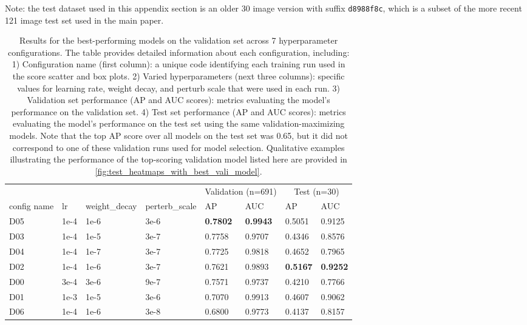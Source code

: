 Note:
the test dataset used in this appendix section is an older 30 image version with suffix {\tt d8988f8c},
  which is a subset of the more recent 121 image test set used in the main paper.


\begin{table*}[t]
\centering
\begin{tabular}{llllllll}
\toprule
            \multicolumn{4}{l}{} & \multicolumn{2}{c}{Validation (n=691)} & \multicolumn{2}{c}{Test (n=30)} \\
config name &   lr & weight\_decay & perterb\_scale & AP & AUC & AP & AUC \\
\midrule
        \textcolor[HTML]{623682}{D05} & 1e-4 &   1e-6 &  3e-6 & \textbf{0.7802} & \textbf{0.9943} &          0.5051 &          0.9125 \\
        \textcolor[HTML]{df8020}{D03} & 1e-4 &   1e-5 &  3e-7 &          0.7758 &          0.9707 &          0.4346 &          0.8576 \\
        \textcolor[HTML]{87b787}{D04} & 1e-4 &   1e-7 &  3e-7 &          0.7725 &          0.9818 &          0.4652 &          0.7965 \\
        \textcolor[HTML]{207fdf}{D02} & 1e-4 &   1e-6 &  3e-7 &          0.7621 &          0.9893 & \textbf{0.5167} & \textbf{0.9252} \\
        \textcolor[HTML]{20df20}{D00} & 3e-4 &   3e-6 &  9e-7 &          0.7571 &          0.9737 &          0.4210 &          0.7766 \\
        \textcolor[HTML]{df20df}{D01} & 1e-3 &   1e-5 &  3e-6 &          0.7070 &          0.9913 &          0.4607 &          0.9062 \\
        \textcolor[HTML]{b00403}{D06} & 1e-4 &   1e-6 &  3e-8 &          0.6800 &          0.9773 &          0.4137 &          0.8157 \\
        
\bottomrule
\end{tabular}
\caption{
Results for the best-performing models on the validation set across 7 hyperparameter configurations.
The table provides detailed information about each configuration, including:
1) Configuration name (first column): a unique code identifying each training run used in the score scatter and box plots.
2) Varied hyperparameters (next three columns): specific values for learning rate, weight decay, and perturb scale that were used in each run.
3) Validation set performance (AP and AUC scores): metrics evaluating the model's performance on the validation set.
4) Test set performance (AP and AUC scores): metrics evaluating the model's performance on the test set using the same validation-maximizing models.
Note that the top AP score over all models on the test set was 0.65, but it did not correspond to one of these validation runs used for model selection.
Qualitative examples illustrating the performance of the top-scoring validation model listed here are provided in \cref{fig:test_heatmaps_with_best_vali_model}.
}
\label{tab:parameters_and_results}
\end{table*}

